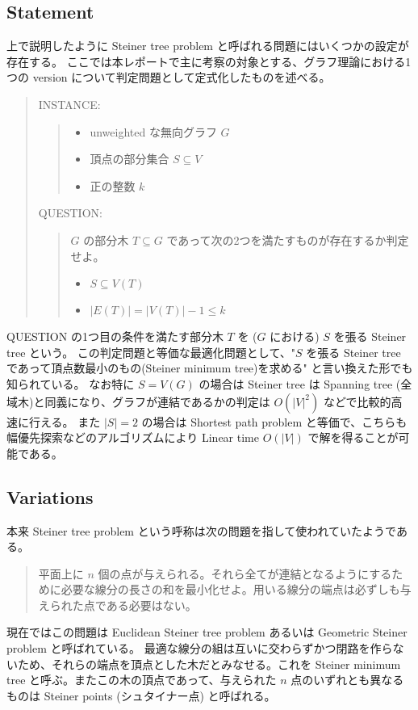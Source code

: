 \documentclass[12pt,uplatex,dvipdfmx,titlepage]{article}
\theoremstyle{case}
\begin{document}
    \subsection{Statement}
    上で説明したように Steiner tree problem と呼ばれる問題にはいくつかの設定が存在する。
    ここでは本レポートで主に考察の対象とする、グラフ理論における1つの version について判定問題として定式化したものを述べる。
    \begin{quote}
        INSTANCE:
        \begin{quote}
            \begin{itemize}
                \item unweighted な無向グラフ $G$
                \item 頂点の部分集合 $S\subseteq V$
                \item 正の整数 $k$
            \end{itemize}
        \end{quote}

        QUESTION:
        \begin{quote}
            $G$ の部分木 $T\subseteq G$ であって次の2つを満たすものが存在するか判定せよ。
            \begin{itemize}
                \item $S\subseteq V(T)$
                \item $|E(T)|=|V(T)|-1\le k$
            \end{itemize}
        \end{quote}
    \end{quote}
    QUESTION の1つ目の条件を満たす部分木 $T$ を ($G$ における) $S$ を張る Steiner tree という。
    この判定問題と等価な最適化問題として、"$S$ を張る Steiner tree であって頂点数最小のもの(Steiner minimum tree)を求める" と言い換えた形でも知られている。
    なお特に $S=V(G)$ の場合は Steiner tree は Spanning tree (全域木)と同義になり、グラフが連結であるかの判定は $O(|V|^2)$ などで比較的高速に行える。
    また $|S|=2$ の場合は Shortest path problem と等価で、こちらも幅優先探索などのアルゴリズムにより Linear time $O(|V|)$ で解を得ることが可能である。

    \subsection{Variations}
    本来 Steiner tree problem という呼称は次の問題を指して使われていたようである。
    \begin{quote}
        平面上に $n$ 個の点が与えられる。それら全てが連結となるようにするために必要な線分の長さの和を最小化せよ。用いる線分の端点は必ずしも与えられた点である必要はない。
    \end{quote}
    現在ではこの問題は Euclidean Steiner tree problem あるいは Geometric Steiner problem と呼ばれている。
    最適な線分の組は互いに交わらずかつ閉路を作らないため、それらの端点を頂点とした木だとみなせる。これを Steiner minimum tree と呼ぶ。またこの木の頂点であって、与えられた $n$ 点のいずれとも異なるものは Steiner points (シュタイナー点) と呼ばれる。
\end{document}
